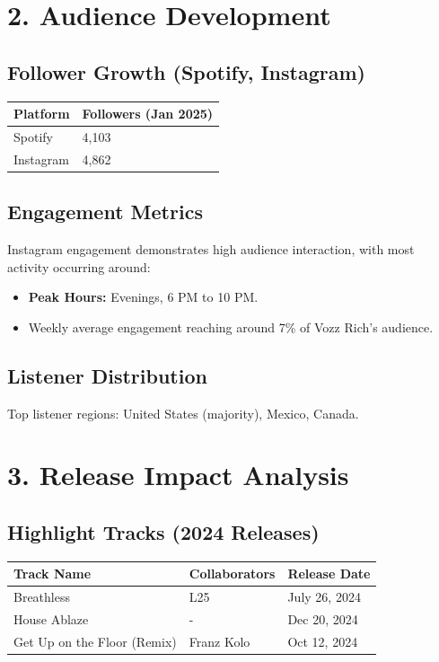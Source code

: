 \documentclass[a4paper,12pt]{article}
\begin{document}
\vspace{1cm}

\section*{2. Audience Development}
\subsection*{Follower Growth (Spotify, Instagram)}
\begin{tabular}{|l|l|}
\hline
\textbf{Platform} & \textbf{Followers (Jan 2025)} \\ \hline
Spotify           & 4,103                         \\ \hline
Instagram         & 4,862                         \\ \hline
\end{tabular}

\vspace{0.5cm}
\subsection*{Engagement Metrics}
Instagram engagement demonstrates high audience interaction, with most activity occurring around:
\begin{itemize}
    \item \textbf{Peak Hours:} Evenings, 6 PM to 10 PM.
    \item Weekly average engagement reaching around 7\% of Vozz Rich's audience.
\end{itemize}

\vspace{0.5cm}
\subsection*{Listener Distribution}
Top listener regions: United States (majority), Mexico, Canada.

\vspace{1cm}

\section*{3. Release Impact Analysis}
\subsection*{Highlight Tracks (2024 Releases)}
\begin{longtable}{|l|l|l|}
\hline
\textbf{Track Name} & \textbf{Collaborators} & \textbf{Release Date} \\ \hline
Breathless         & L25                   & July 26, 2024         \\ \hline
House Ablaze       & -                     & Dec 20, 2024          \\ \hline
Get Up on the Floor (Remix) & Franz Kolo      & Oct 12, 2024          \\ \hline
\end{longtable}
\end{document}
